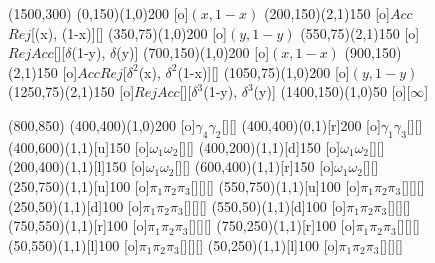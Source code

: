 \documentclass{article}
\begin{document}
\begin{figure}[h]
\begin{footnotesize}
\begin{center}
\begin{egame}(1500,300)
\putbranch(0,150)(1,0){200} [o]{$(x, 1-x)$}
\putbranch(200,150)(2,1){150}  [o]{$Acc$}{$Rej$}[(x), (1-x)][]
\putbranch(350,75)(1,0){200} [o]{$(y, 1-y)$}
\putbranch(550,75)(2,1){150}  [o]{$Rej$}{$Acc$}[][$\delta$(1-y), $\delta$(y)]
\putbranch(700,150)(1,0){200} [o]{$(x, 1-x)$}
\putbranch(900,150)(2,1){150}  [o]{$Acc$}{$Rej$}[$\delta^2$(x), $\delta^2$(1-x)][]
\putbranch(1050,75)(1,0){200} [o]{$(y, 1-y)$}
\putbranch(1250,75)(2,1){150}  [o]{$Rej$}{$Acc$}[][$\delta^3$(1-y), $\delta^3$(y)]
\putbranch(1400,150)(1,0){50} \ib[linestyle=dotted, linewidth=1pt]{}[o]{}[$\infty$]
\end{egame}
\end{center}
\end{footnotesize}
\end{figure}


\begin{figure}[h]
\begin{footnotesize}
\begin{center}
\begin{egame}(800,850)
\putbranch(400,400)(1,0){200} [o]{$\gamma_4$}{$\gamma_2$}[][]
\putbranch(400,400)(0,1)[r]{200} [o]{$\gamma_1$}{$\gamma_3$}[][]
\putbranch(400,600)(1,1)[u]{150} [o]{$\omega_1$}{$\omega_2$}[][]
\putbranch(400,200)(1,1)[d]{150} [o]{$\omega_1$}{$\omega_2$}[][]
\putbranch(200,400)(1,1)[l]{150} [o]{$\omega_1$}{$\omega_2$}[][]
\putbranch(600,400)(1,1)[r]{150} [o]{$\omega_1$}{$\omega_2$}[][]
\putbranch(250,750)(1,1)[u]{100} [o]{$\pi_1$}{$\pi_2$}{$\pi_3$}[][][]
\putbranch(550,750)(1,1)[u]{100} [o]{$\pi_1$}{$\pi_2$}{$\pi_3$}[][][]
\putbranch(250,50)(1,1)[d]{100} [o]{$\pi_1$}{$\pi_2$}{$\pi_3$}[][][]
\putbranch(550,50)(1,1)[d]{100} [o]{$\pi_1$}{$\pi_2$}{$\pi_3$}[][][]
\putbranch(750,550)(1,1)[r]{100} [o]{$\pi_1$}{$\pi_2$}{$\pi_3$}[][][]
\putbranch(750,250)(1,1)[r]{100} [o]{$\pi_1$}{$\pi_2$}{$\pi_3$}[][][]
\putbranch(50,550)(1,1)[l]{100} [o]{$\pi_1$}{$\pi_2$}{$\pi_3$}[][][]
\putbranch(50,250)(1,1)[l]{100} [o]{$\pi_1$}{$\pi_2$}{$\pi_3$}[][][]
\end{egame}
\end{center}
\end{footnotesize}
\end{figure}
\end{document}
